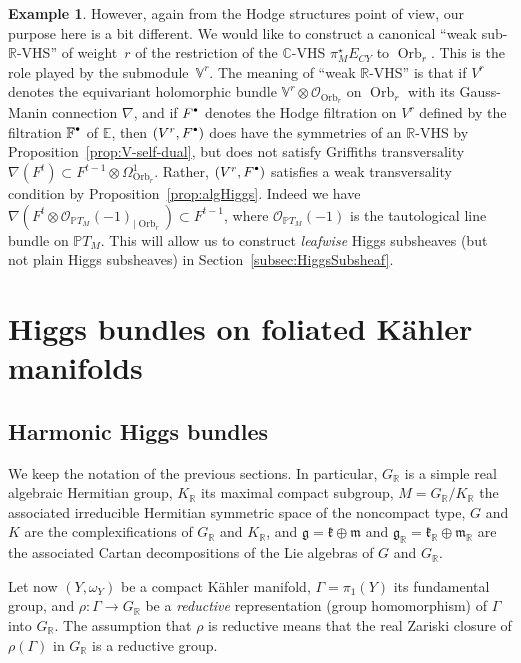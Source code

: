 \documentclass[JEP,XML,SOM,Unicode,NoFloatCountersInSection]{cedram}
\let\mathcal\mathscr
\newcommand{\sbullet}{{\scriptscriptstyle\bullet}}
\newcommand{\scbullet}{{\raisebox{1pt}{$\sbullet$}}}
\theoremstyle{plain}
\theoremstyle{definition}
\newtheorem{exem}[theo]{Example}
\let\rgy r
\DeclareMathOperator{\Orb}{Orb}
\newcommand{\cO}{\mathcal{O}}
\newcommand{\bC}{\mathbb{C}}
\newcommand{\bE}{\mathbb{E}}
\newcommand{\bF}{\mathbb{F}}
\newcommand{\bR}{\mathbb{R}}
\newcommand{\bPTM}{{\mathbb{P}T_M}}
\newcommand{\Vr}{\mathbb{V}^\rgy}
\newcommand{\fgg}{\mathfrak{g}}
\newcommand{\fk}{\mathfrak{k}}
\newcommand{\fm}{\mathfrak{m}}
\begin{document}
\begin{exem}
However, again from the Hodge structures point of view, our purpose here is a bit
different. We would like to construct a canonical ``weak sub-$\bR$-VHS'' of weight~$\rgy$ of the
restriction of
the $\bC$-VHS $\pi_M^\star E_{CY}$ to ${\Orb}_\rgy$. This is the role played by the submodule~$\Vr$. The meaning of ``weak $\bR$-VHS'' is that if $V^\rgy$ denotes the equivariant holomorphic
bundle $\Vr\otimes\cO_{\Orb_\rgy}$ on $\Orb_\rgy$ with its Gauss-Manin connection $\nabla$, and if
$F^\scbullet$ denotes the Hodge filtration on $V^r$ defined by the filtration $\bF^\scbullet$ of $\bE$, then
$(V^r,F^\scbullet)$ does have the symmetries of an $\bR$-VHS by Proposition~\ref{prop:V-self-dual},
but does not satisfy
Griffiths transversality $\nabla(F^t)\subset F^{t-1}\otimes\Omega^1_{\Orb_\rgy}$. Rather,
$(V^\rgy,F^\scbullet)$ satisfies a weak transversality condition by
Proposition~\ref{prop:algHiggs}. Indeed we have
$\nabla(F^t\otimes\cO_\bPTM(-1)_{|\Orb_\rgy})\subset F^{t-1}$, where $\cO_\bPTM(-1)$ is the
tautological line bundle on $\bPTM$. This will allow us to construct \emph{leafwise}
Higgs subsheaves (but not plain Higgs subsheaves) in Section~\ref{subsec:HiggsSubsheaf}.
\end{exem}

\section{Higgs bundles on foliated Kähler manifolds}
\label{sec:HiggsFoliated}

\subsection{Harmonic Higgs bundles}
\label{subsec:Higgs}

We keep the notation of the previous sections. In particular, $G_\bR$ is a simple real algebraic
Hermitian group, $K_\bR$ its maximal compact subgroup, $M=G_\bR/K_\bR$ the associated irreducible
Hermitian symmetric space of the noncompact type, $G$ and $K$ are the complexifications of $G_\bR$
and $K_\bR$, and $\fgg=\fk\oplus\fm$ and $\fgg_\bR=\fk_\bR\oplus\fm_\bR$ are the
associated Cartan decompositions of the Lie algebras of $G$ and $G_\bR$.

Let now $(Y,\omega_Y)$ be a compact Kähler manifold, $\Gamma=\pi_1(Y)$ its fundamental group, and $\rho:\Gamma\to
G_\bR$ be a
\emph{reductive} representation (group homomorphism) of $\Gamma$ into $G_\bR$. The assumption that $\rho$
is reductive
means that the real Zariski closure of $\rho(\Gamma)$ in $G_\bR$ is a reductive group.
\end{document}
